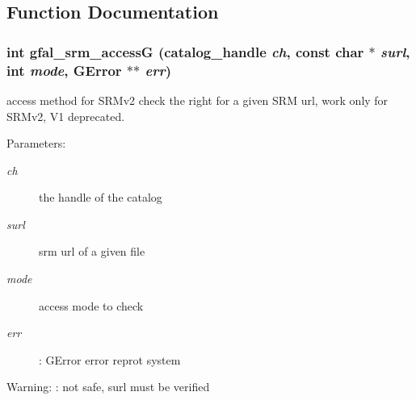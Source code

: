 \subsection{Function Documentation}
\subsubsection{\setlength{\rightskip}{0pt plus 5cm}int gfal\_\-srm\_\-access\-G (catalog\_\-handle {\em ch}, const char $\ast$ {\em surl}, int {\em mode}, GError $\ast$$\ast$ {\em err})}\label{gfal__common__srm__access_8h_fb067c53506a97a400866960ba75446c}


access method for SRMv2 check the right for a given SRM url, work only for SRMv2, V1 deprecated. 

\begin{Desc}
\item[Parameters:]
\begin{description}
\item[{\em ch}]the handle of the catalog \item[{\em surl}]srm url of a given file \item[{\em mode}]access mode to check \item[{\em err}]: GError error reprot system \end{description}
\end{Desc}
\begin{Desc}
\item[Warning:]: not safe, surl must be verified \end{Desc}
